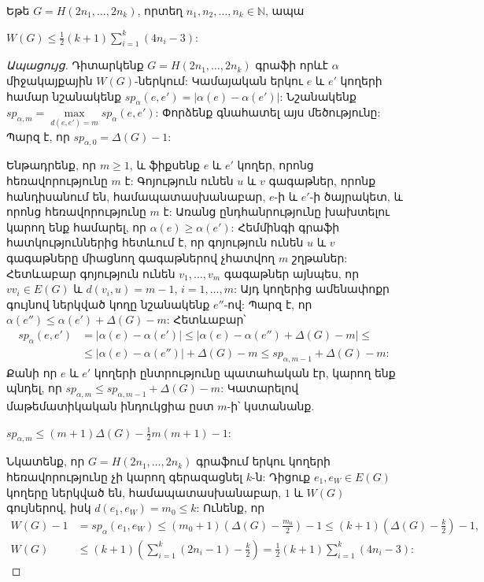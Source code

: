 \begin{theorem}
\label{t2_Hamming_upper}
Եթե $G = H(2n_1,\ldots,2n_k)$, որտեղ $n_1, n_2, \ldots, n_k \in \mathbb{N}$, ապա
\begin{center}
$W(G) \leq \frac{1}{2}(k+1)\sum_{i=1}^{k}{(4n_i-3)}$:
\end{center}
\end{theorem}

\begin{proof}[Ապացույց]
Դիտարկենք $G=H(2n_1,\ldots,2n_k)$ գրաֆի որևէ $\alpha$ միջակայքային $W(G)$-ներկում: Կամայական երկու $e$ և $e'$ կողերի համար նշանակենք $sp_{\alpha}(e,e') = |\alpha(e) - \alpha(e')|$: Նշանակենք $sp_{\alpha,m} = \max\limits_{d(e,e')=m}{sp_{\alpha}(e,e')}$: Փորձենք գնահատել այս մեծությունը: Պարզ է, որ $sp_{\alpha,0} = \Delta(G)-1$: 

Ենթադրենք, որ $m \geq 1$, և ֆիքսենք $e$ և $e'$ կողեր, որոնց հեռավորությունը $m$ է: Գոյություն ունեն $u$ և $v$ գագաթներ, որոնք հանդիսանում են, համապատասխանաբար, $e$-ի և $e'$-ի ծայրակետ, և որոնց հեռավորությունը $m$ է: Առանց ընդհանրությունը խախտելու կարող ենք համարել, որ $\alpha(e) \geq \alpha(e')$: Հեմմինգի գրաֆի հատկություններից հետևում է, որ գոյություն ունեն $u$ և $v$ գագաթները միացնող գագաթներով չհատվող $m$ շղթաներ: Հետևաբար գոյություն ունեն $v_1, \ldots, v_m$ գագաթներ այնպես, որ $vv_i \in E(G)$ և $d(v_i,u)=m-1$, $i=1,\ldots,m$:  Այդ կողերից ամենափոքր գույնով ներկված կողը նշանակենք $e''$-ով: Պարզ է, որ $\alpha(e'') \leq \alpha(e') + \Delta(G) - m$: Հետևաբար՝
\begin{align*}
sp_{\alpha}(e, e') &= |\alpha(e) - \alpha(e')| \leq |\alpha(e) - \alpha(e'') + \Delta(G) - m| \leq \\
& \leq |\alpha(e)-\alpha(e'')| + \Delta(G) -m \leq sp_{\alpha,m-1} + \Delta(G) - m:
\end{align*}
Քանի որ $e$ և $e'$ կողերի ընտրությունը պատահական էր, կարող ենք պնդել, որ $sp_{\alpha,m} \leq sp_{\alpha,m-1} + \Delta(G) - m$: Կատարելով մաթեմատիկական ինդուկցիա ըստ $m$-ի՝ կստանանք.
\begin{center}
$sp_{\alpha,m} \leq (m+1)\Delta(G)-\frac{1}{2}m(m+1) - 1$:
\end{center}

Նկատենք, որ $G=H(2n_1, \ldots, 2n_k)$ գրաֆում երկու կողերի հեռավորությունը չի կարող գերազացնել $k$-ն: Դիցուք $e_1,e_W \in E(G)$ կողերը ներկված են, համապատասխանաբար, $1$ և $W(G)$ գույներով, իսկ $d(e_1,e_W)=m_0 \leq k$: Ունենք, որ
\begin{align*}
W(G)-1 &= sp_{\alpha}(e_1,e_W) \leq (m_0+1)\left(\Delta(G) - \frac{m_0}{2}\right) - 1 \leq (k+1)\left(\Delta(G) - \frac{k}{2}\right) - 1,\\
W(G) &\leq (k+1)\left(\sum\limits_{i=1}^{k}{(2n_i-1)} - \frac{k}{2}\right) = \frac{1}{2}(k+1)\sum\limits_{i=1}^{k}{(4n_i-3)}:
\end{align*}
\end{proof}


